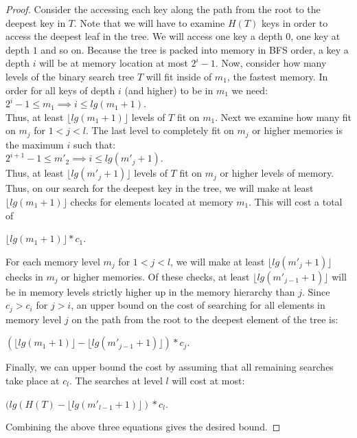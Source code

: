 \documentclass[letterpaper,12pt,titlepage,oneside,final]{book}
\theoremstyle{plain}
\begin{document}
\begin{proof}
Consider the accessing each key along the path from the root to the deepest key in $T$. Note that we will have to examine $H(T)$ keys in order to access the deepest leaf in the tree. We will access one key a depth $0$, one key at depth $1$ and so on. Because the tree is packed into memory in BFS order, a key a depth $i$ will be at memory location at most $2^i-1$. Now, consider how many levels of the binary search tree $T$ will fit inside of $m_1$, the fastest memory. In order for all keys of depth $i$ (and higher) to be in $m_1$ we need: \\
$2^i-1 \leq m_1 \implies i \leq lg(m_1 + 1)$. \\
Thus, at least $\lfloor lg(m_1 + 1) \rfloor$ levels of $T$ fit on $m_1$. Next we examine how many fit on $m_j$ for $1 < j < l$. The last level to completely fit on $m_j$ or higher memories is the maximum $i$ such that: \\
$2^{i+1}-1 \leq m'_2 \implies i \leq lg(m'_j + 1)$. \\
Thus, at least $\lfloor lg(m'_j + 1) \rfloor$ levels of $T$ fit on $m_j$ or higher levels of memory. \\
Thus, on our search for the deepest key in the tree, we will make at least $\lfloor lg(m_1 + 1) \rfloor$ checks for elements located at memory $m_1$. This will cost a total of\\
\begin{center}
$\lfloor lg(m_1 + 1) \rfloor * c_1$.\\
\end{center}
For each memory level $m_j$ for $1 < j < l$, we will make at least $\lfloor lg(m'_j + 1) \rfloor$ checks in $m_j$ or higher memories. Of these checks, at least $\lfloor lg(m'_{j-1} + 1) \rfloor$ will be in memory levels strictly higher up in the memory hierarchy than $j$. Since $c_j > c_i$ for $j > i$, an upper bound on the cost of searching for all elements in memory level $j$ on the path from the root to the deepest element of the tree is: \\
\begin{center}
$(\lfloor lg(m_1 + 1) \rfloor - \lfloor lg(m'_{j-1} + 1) \rfloor) * c_j$.\\
\end{center}
Finally, we can upper bound the cost by assuming that all remaining searches take place at $c_l$. The searches at level $l$ will cost at most: \\

\iffalse
\begin{center}
$(lg(\frac{1}{min_{p,q}}) + lg(m_1) + 2 - \lfloor lg(m'_{l-1}+1) \rfloor)*c_l$. \\
\end{center}
\fi

\begin{center}
$(lg(H(T) - \lfloor lg(m'_{l-1}+1) \rfloor)*c_l$. \\
\end{center}

Combining the above three equations gives the desired bound.

\end{proof}
\end{document}
